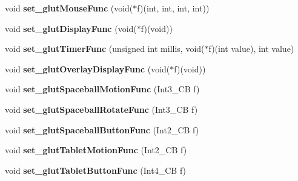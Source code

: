 \begin{DoxyCompactItemize}
\item 
\hypertarget{classGLUI__Master__Object_a8cfe4c66d1eae820db4409ea7f4cdd61}{void {\bfseries set\-\_\-glut\-Mouse\-Func} (void($\ast$f)(int, int, int, int))}\label{classGLUI__Master__Object_a8cfe4c66d1eae820db4409ea7f4cdd61}

\item 
\hypertarget{classGLUI__Master__Object_a2a20f0e78093357d1b2ca9099dccab2a}{void {\bfseries set\-\_\-glut\-Display\-Func} (void($\ast$f)(void))}\label{classGLUI__Master__Object_a2a20f0e78093357d1b2ca9099dccab2a}

\item 
\hypertarget{classGLUI__Master__Object_a57fd64245124e6d77e78b2d33b8d34b4}{void {\bfseries set\-\_\-glut\-Timer\-Func} (unsigned int millis, void($\ast$f)(int value), int value)}\label{classGLUI__Master__Object_a57fd64245124e6d77e78b2d33b8d34b4}

\item 
\hypertarget{classGLUI__Master__Object_aa36f406dc447d6903dec41d7b3a8293e}{void {\bfseries set\-\_\-glut\-Overlay\-Display\-Func} (void($\ast$f)(void))}\label{classGLUI__Master__Object_aa36f406dc447d6903dec41d7b3a8293e}

\item 
\hypertarget{classGLUI__Master__Object_acfcb50c389eb48a599ffabfa87ee91d7}{void {\bfseries set\-\_\-glut\-Spaceball\-Motion\-Func} (Int3\-\_\-\-C\-B f)}\label{classGLUI__Master__Object_acfcb50c389eb48a599ffabfa87ee91d7}

\item 
\hypertarget{classGLUI__Master__Object_a0d8211580f34f3349c4c63431220049c}{void {\bfseries set\-\_\-glut\-Spaceball\-Rotate\-Func} (Int3\-\_\-\-C\-B f)}\label{classGLUI__Master__Object_a0d8211580f34f3349c4c63431220049c}

\item 
\hypertarget{classGLUI__Master__Object_a47961d2385bfbbb58c5cc2aac24473b0}{void {\bfseries set\-\_\-glut\-Spaceball\-Button\-Func} (Int2\-\_\-\-C\-B f)}\label{classGLUI__Master__Object_a47961d2385bfbbb58c5cc2aac24473b0}

\item 
\hypertarget{classGLUI__Master__Object_aa0f01144f1894acdebffce2c0c3d1a93}{void {\bfseries set\-\_\-glut\-Tablet\-Motion\-Func} (Int2\-\_\-\-C\-B f)}\label{classGLUI__Master__Object_aa0f01144f1894acdebffce2c0c3d1a93}

\item 
\hypertarget{classGLUI__Master__Object_a449c4ac3bd2edfb6854b90543b6633de}{void {\bfseries set\-\_\-glut\-Tablet\-Button\-Func} (Int4\-\_\-\-C\-B f)}\label{classGLUI__Master__Object_a449c4ac3bd2edfb6854b90543b6633de}


\end{DoxyCompactItemize}
